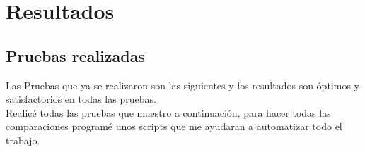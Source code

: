\documentclass[12pt]{article}
\newcommand\tab[1][0.5cm]{\hspace*{#1}}
\newcommand\vtab[1][0.5cm]{\vspace*{#1}}
\begin{document}
\section{Resultados}
\subsection{Pruebas realizadas}
Las Pruebas que ya se realizaron son las siguientes y los resultados son óptimos y satisfactorios en todas las pruebas.\\
Realicé todas las pruebas que muestro a continuación, para hacer todas las comparaciones programé unos scripts que me ayudaran a 
automatizar todo el trabajo.

\end{document}
